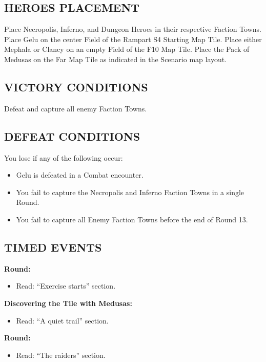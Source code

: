 \begin{multicols*}{2}
\subsection*{\MakeUppercase{Heroes Placement}}

Place Necropolis, Inferno, and Dungeon Heroes in their respective Faction Towns.
Place Gelu on the center Field of the Rampart S4 Starting Map Tile.
Place either Mephala or Clancy on an empty Field of the F10 Map Tile.
Place the Pack of Medusas on the Far Map Tile as indicated in the Scenario map layout.

\subsection*{\MakeUppercase{Victory Conditions}}

Defeat and capture all enemy Faction Towns.

\subsection*{\MakeUppercase{Defeat Conditions}}

You lose if any of the following occur:
\begin{itemize}
  \item Gelu is defeated in a Combat encounter.
  \item You fail to capture the Necropolis and Inferno Faction Towns in a single Round.
  \item You fail to capture all Enemy Faction Towns before the end of Round 13.
\end{itemize}

\subsection*{\MakeUppercase{Timed Events}}

\textbf{ Round:}
\begin{itemize}
  \item Read: ``Exercise starts'' section.
  \end{itemize}

\textbf{Discovering the Tile with Medusas:}
\begin{itemize}
  \item Read: ``A quiet trail'' section.
\end{itemize}

\textbf{ Round:}
\begin{itemize}
  \item Read: ``The raiders'' section.
\end{itemize}


\end{multicols*}
